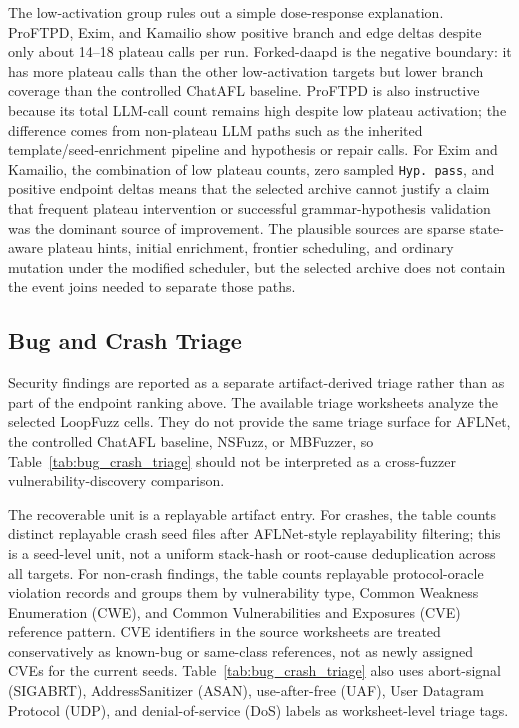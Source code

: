 \documentclass[final,5p,times,number]{elsarticle}
\begin{document}
The low-activation group rules out a simple dose-response explanation. ProFTPD, Exim, and Kamailio show positive branch and edge deltas despite only about 14--18 plateau calls per run. Forked-daapd is the negative boundary: it has more plateau calls than the other low-activation targets but lower branch coverage than the controlled ChatAFL baseline. ProFTPD is also instructive because its total LLM-call count remains high despite low plateau activation; the difference comes from non-plateau LLM paths such as the inherited template/seed-enrichment pipeline and hypothesis or repair calls. For Exim and Kamailio, the combination of low plateau counts, zero sampled \texttt{Hyp. pass}, and positive endpoint deltas means that the selected archive cannot justify a claim that frequent plateau intervention or successful grammar-hypothesis validation was the dominant source of improvement. The plausible sources are sparse state-aware plateau hints, initial enrichment, frontier scheduling, and ordinary mutation under the modified scheduler, but the selected archive does not contain the event joins needed to separate those paths.

\subsection{Bug and Crash Triage}
\label{sec:bug_crash_triage}

Security findings are reported as a separate artifact-derived triage rather than as part of the endpoint ranking above. The available triage worksheets analyze the selected LoopFuzz cells. They do not provide the same triage surface for AFLNet, the controlled ChatAFL baseline, NSFuzz, or MBFuzzer, so Table~\ref{tab:bug_crash_triage} should not be interpreted as a cross-fuzzer vulnerability-discovery comparison.

The recoverable unit is a replayable artifact entry. For crashes, the table counts distinct replayable crash seed files after AFLNet-style replayability filtering; this is a seed-level unit, not a uniform stack-hash or root-cause deduplication across all targets. For non-crash findings, the table counts replayable protocol-oracle violation records and groups them by vulnerability type, Common Weakness Enumeration (CWE), and Common Vulnerabilities and Exposures (CVE) reference pattern. CVE identifiers in the source worksheets are treated conservatively as known-bug or same-class references, not as newly assigned CVEs for the current seeds. Table~\ref{tab:bug_crash_triage} also uses abort-signal (SIGABRT), AddressSanitizer (ASAN), use-after-free (UAF), User Datagram Protocol (UDP), and denial-of-service (DoS) labels as worksheet-level triage tags.
\end{document}
